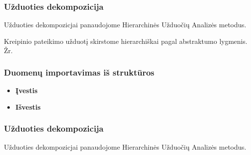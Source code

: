 	\subsubsection {Užduoties dekompozicija}

	Užduoties dekompozicjai panaudojome Hierarchinės Užduočių Analizės metodus.
 		

	Kreipinio pateikimo užduotį skirstome hierarchiškai pagal abstraktumo lygmenis. Žr. 

	\subsubsection {Duomenų importavimas iš struktūros}

		\begin{itemize}
			\item \textbf{Įvestis}
			\item \textbf{Išvestis} 
		\end{itemize}
		
	\subsubsection {Užduoties dekompozicija}

	Užduoties dekompozicjai panaudojome Hierarchinės Užduočių Analizės metodus.

